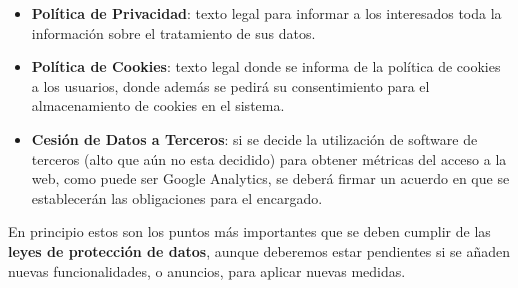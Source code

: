 \begin{itemize}
	\item \textbf{Política de Privacidad}: texto legal para informar a los interesados toda la información sobre el tratamiento de sus datos.
	
	\item \textbf{Política de Cookies}: texto legal donde se informa de la política de cookies a los usuarios, donde además se pedirá su consentimiento para el almacenamiento de cookies en el sistema.
	
	\item \textbf{Cesión de Datos a Terceros}: si se decide la utilización de software de terceros (alto que aún no esta decidido) para obtener métricas del acceso a la web, como puede ser Google Analytics, se deberá firmar un acuerdo en que se establecerán las obligaciones para el encargado.
\end{itemize}

En principio estos son los puntos más importantes que se deben cumplir de las \textbf{leyes de protección de datos}, aunque deberemos estar pendientes si se añaden nuevas funcionalidades, o anuncios, para aplicar nuevas medidas.

\newpage

\appendix

